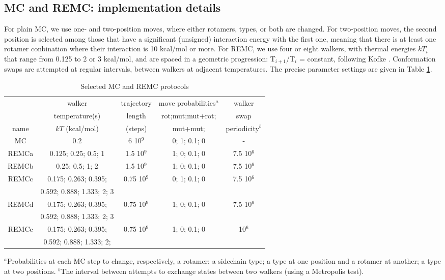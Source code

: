 \subsection{MC and REMC: implementation details}
\label{sub:REMCdetails}
For plain MC, we use one- and two-position moves, where either rotamers, types, or both are changed.
For two-position moves, the second position is selected among those that have a significant (unsigned) interaction energy with the first one, meaning that there is at least one rotamer conbination where their interaction is 10 kcal/mol or more.
For REMC, we use four or eight walkers, with thermal energies $kT_i$ that range from 0.125
to 2 or 3 kcal/mol, and are spaced in a geometric progression: T$_{i+1}$/T$_i$ = constant, following Kofke \cite{Kofke02}.
Conformation swaps are attempted at regular intervals, between walkers at adjacent temperatures.
The precise parameter settings are given in Table \ref{tab:parameters}.

\begin{table}[H]                            
\caption{Selected MC and REMC protocols}
\label{tab:parameters}                      
\begin{center} \small 
\renewcommand{\arraystretch}{0.75}
\begin{tabular}{ccccc} \hline \hline  
      &  walker                   & trajectory & move probabilities$^a$ & walker     \\ 
      &  temperature(s)           & length     & rot;mut;mut+rot; & swap       \\ 
name  & $kT$ (kcal/mol)           & (steps)    & mut+mut;         & periodicity$^b$ \smallskip \\  \hline 
MC    & 0.2                       &   6 10$^9$ & 0; 1; 0.1; 0     &  -          \smallskip \\      
REMCa & 0.125; 0.25; 0.5; 1       & 1.5 10$^9$ & 1; 0; 0.1; 0     & 7.5 10$^6$  \smallskip \\   
REMCb & 0.25; 0.5; 1; 2           & 1.5 10$^9$ & 1; 0; 0.1; 0     & 7.5 10$^6$  \smallskip \\ 
REMCc & 0.175; 0.263; 0.395;      & 0.75 10$^9$& 0; 1; 0.1; 0     & 7.5 10$^6$  \\
      & 0.592; 0.888; 1.333; 2; 3 &  &  &  \smallskip \\
REMCd & 0.175; 0.263; 0.395;      &0.75 10$^9$ & 1; 0; 0.1; 0     & 7.5 10$^6$  \\
      & 0.592; 0.888; 1.333; 2; 3 &  &  &  \smallskip \\
REMCe & 0.175; 0.263; 0.395;      &0.75 10$^9$ & 1; 0; 0.1; 0     &     10$^6$  \\ 
      & 0.592; 0.888; 1.333; 2;   &  &  &  \smallskip \\ \hline
\end{tabular}
\end{center}
{\small \noindent $^a$Probabilities at each MC step to change, respectively, a rotamer; a sidechain type; a type at one position and a rotamer at another;
a type at two positions. $^b$The interval between attempts to exchange states
between two walkers (using a Metropolis test).
}
\end{table}

